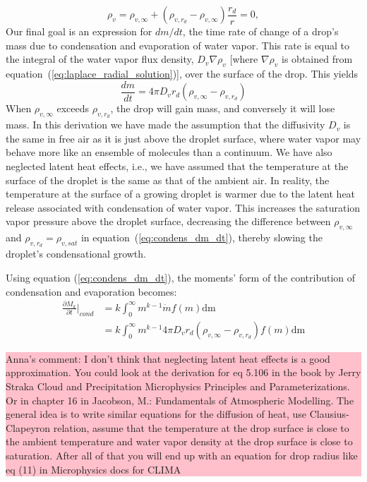 \documentclass{report}
\begin{document}
\begin{equation}
    \rho_v = \rho_{v, \infty} + (\rho_{v, r_d} - \rho_{v, \infty}) \frac{r_{d}}{r} = 0, 
    \label{eq:laplace_radial_solution}
\end{equation}
Our final goal is an expression for $dm/dt$, the time rate of change of a drop's mass due to condensation and evaporation of water vapor. This rate is equal to the integral of the water vapor flux density, $D_v \nabla \rho_v$ [where $\nabla \rho_v$ is obtained from equation~(\ref{eq:laplace_radial_solution})], over the surface of the drop. This yields
\begin{equation}
    \frac{dm}{dt} = 4 \pi D_v r_d (\rho_{v, \infty} - \rho_{v, r_d}) 
    \label{eq:condens_dm_dt}
\end{equation}
When $\rho_{v, \infty}$ exceeds $\rho_{v, r_d}$, the drop will gain mass, and conversely it will lose mass. In this derivation we have made the assumption that the diffusivity $D_v$ is the same in free air as it is just above the droplet surface, where water vapor may behave more like an ensemble of molecules than a continuum. We have also neglected latent heat effects, i.e., we have assumed that the temperature at the surface of the droplet is the same as that of the ambient air. In reality, the temperature at the surface of a growing droplet is warmer due to the latent heat release associated with condensation of water vapor. This increases the saturation vapor pressure above the droplet surface, decreasing the difference between $\rho_{v, \infty}$ and $\rho_{v, r_d}=\rho_{v, sat}$ in equation~({\ref{eq:condens_dm_dt}}), thereby slowing the droplet's condensational growth.

Using equation (\ref{eq:condens_dm_dt}), the moments' form of the contribution of condensation and evaporation becomes:
\begin{equation}
\begin{aligned}
    \frac{\partial M_k}{\partial t} \biggr\rvert_{cond} &= k\int_0^\infty m^{k-1}\dot{m}f(m) \text{dm} \\
                                                        &= k\int_0^\infty m^{k-1}4 \pi D_v r_d (\rho_{v, \infty} - \rho_{v, r_d})f(m) \text{dm}
\label{eq:condensation_moments}
\end{aligned}
\end{equation}

\noindent
\colorbox{pink}{\parbox{12cm}{Anna's comment: I don't think that neglecting latent heat effects is a good approximation. 
You could look at the derivation for eq 5.106 in the book by Jerry Straka Cloud and Precipitation 
Microphysics Principles and Parameterizations. Or in chapter 16 in Jacobson, M.: Fundamentals of Atmospheric Modelling. The general idea is to write similar equations for the diffusion of heat,
use Clausius-Clapeyron relation, assume that the temperature at the drop surface is close to the ambient temperature and water vapor density at the drop surface is close to saturation.
After all of that you will end up with an equation for drop radius like eq (11) in Microphysics
docs for CLIMA}}
\end{document}
